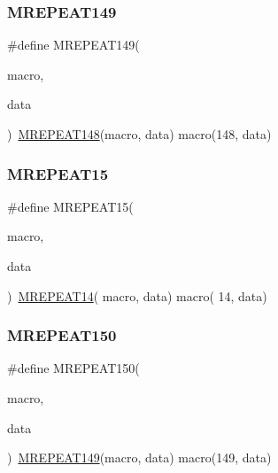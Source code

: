 \mbox{\label{group__group__sam0__utils__mrepeat_ga18ca1b3d19447f3bbe8d3d10c5f238b2}} 
\subsubsection{\texorpdfstring{MREPEAT149}{MREPEAT149}}
{\footnotesize\ttfamily \#define M\+R\+E\+P\+E\+A\+T149(\begin{DoxyParamCaption}\item[{}]{macro,  }\item[{}]{data }\end{DoxyParamCaption})~\mbox{\hyperlink{group__group__sam0__utils__mrepeat_gae6c61eb095a85d084a71dee42aa35eac}{M\+R\+E\+P\+E\+A\+T148}}(macro, data)   macro(148, data)}

\mbox{\label{group__group__sam0__utils__mrepeat_gaa3c5de4c7a937ef2f00049285ed41a0a}} 
\subsubsection{\texorpdfstring{MREPEAT15}{MREPEAT15}}
{\footnotesize\ttfamily \#define M\+R\+E\+P\+E\+A\+T15(\begin{DoxyParamCaption}\item[{}]{macro,  }\item[{}]{data }\end{DoxyParamCaption})~\mbox{\hyperlink{group__group__sam0__utils__mrepeat_gab75712b9509bac034c07db02ea0e0485}{M\+R\+E\+P\+E\+A\+T14}}( macro, data)   macro( 14, data)}

\mbox{\label{group__group__sam0__utils__mrepeat_ga4b6a38c831a6d78f44cc9348c496dc5a}} 
\subsubsection{\texorpdfstring{MREPEAT150}{MREPEAT150}}
{\footnotesize\ttfamily \#define M\+R\+E\+P\+E\+A\+T150(\begin{DoxyParamCaption}\item[{}]{macro,  }\item[{}]{data }\end{DoxyParamCaption})~\mbox{\hyperlink{group__group__sam0__utils__mrepeat_ga18ca1b3d19447f3bbe8d3d10c5f238b2}{M\+R\+E\+P\+E\+A\+T149}}(macro, data)   macro(149, data)}

